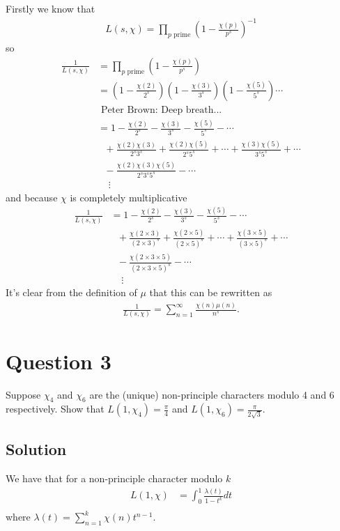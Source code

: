 \documentclass{unswmaths}
\begin{document}
Firstly we know that 
\begin{align*}
	L(s,\chi) = \prod_{p \text{ prime}} \left( 1 - \frac{\chi(p)}{p^s} \right)^{-1}
\end{align*}
so 
\begin{align*}
	\frac{1}{L(s,\chi)} &= \prod_{p \text{ prime}} \left( 1 - \frac{\chi(p)}{p^s} \right) \\
		&= \left( 1 - \frac{\chi(2)}{2^s}\right) \left( 1 - \frac{\chi(3)}{3^s}\right)\left( 1 - \frac{\chi(5)}{5^s}\right)\cdots \\
		&\text{ Peter Brown: Deep breath...} \\
		&= 1 - \frac{\chi(2)}{2^s} - \frac{\chi(3)}{3^s} - \frac{\chi(5)}{5^s} - \cdots \\
		& \ \ \ + \frac{\chi(2)\chi(3)}{2^s3^s} + \frac{\chi(2)\chi(5)}{2^s5^s} + \cdots + \frac{\chi(3)\chi(5)}{3^s5^s} + \cdots \\
		& \ \ \ - \frac{\chi(2)\chi(3)\chi(5)}{2^s3^s5^s} - \cdots \\
		& \ \ \ \ \ \vdots
\end{align*}
and because $ \chi $ is completely multiplicative
\begin{align*}
	\frac{1}{L(s,\chi)}
		&= 1 - \frac{\chi(2)}{2^s} - \frac{\chi(3)}{3^s} - \frac{\chi(5)}{5^s} - \cdots \\
		& \ \ \ + \frac{\chi(2 \times 3)}{(2\times 3)^s} + \frac{\chi(2\times 5)}{(2 \times 5)^s} + \cdots + \frac{\chi(3 \times 5)}{(3 \times 5)^s} + \cdots \\
		& \ \ \ - \frac{\chi(2 \times 3 \times 5)}{(2 \times 3 \times 5)^s} - \cdots \\
		& \ \ \ \ \ \vdots
\end{align*}
It's clear from the definition of $ \mu $ that this can be rewritten as
\begin{align*}
	\frac{1}{L(s,\chi)} = \sum_{n=1}^\infty \frac{\chi(n)\mu(n)}{n^s}.
\end{align*}

\section*{Question 3}
Suppose $ \chi_4 $ and $ \chi_6 $ are the (unique) non-principle characters modulo 4 and 6 respectively.
Show that $ L(1, \chi_4)  = \frac{\pi}{4} $ and $ L(1, \chi_6) = \frac{\pi}{2\sqrt{3}} $. 

\subsection*{Solution}
We have that for a non-principle character modulo $ k $
\begin{align*}
	L(1, \chi) &= \int_0^1 \frac{\lambda(t)}{1-t^k} dt \\
\end{align*}
where $ \lambda(t) = \sum_{n=1}^k \chi(n)t^{n-1} $.
\end{document}
